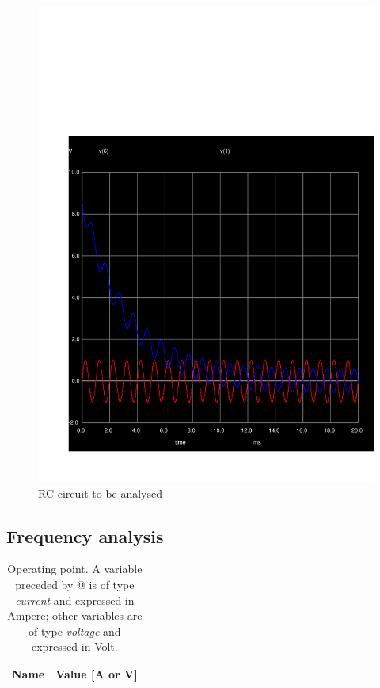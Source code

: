   \begin{figure}[H] \centering
    \includegraphics[width=1\linewidth]{../sim/trans4.pdf}
    \caption{RC circuit to be analysed}
    \label{fig:t2}
    \end{figure}

  \subsection{Frequency analysis}

  \begin{table}[H]
    \centering
    \begin{tabular}{|l|r|}
      \hline    
      {\bf Name} & {\bf Value [A or V]} \\ \hline
      
    \end{tabular}
    \caption{Operating point. A variable preceded by @ is of type {\em current}
      and expressed in Ampere; other variables are of type {\it voltage} and expressed in
      Volt.}
    \label{tab:p5}
  \end{table}

